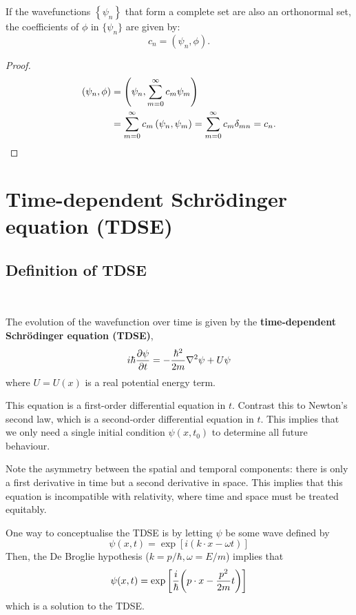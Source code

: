 \documentclass[a4paper,11pt]{article}
\begin{document}
\begin{lemma}
    If the wavefunctions $\left\{\psi_n\right\}$ that form a complete set are also an orthonormal set, the coefficients of $ \phi $ in $ \{\psi_n\} $ are given by:
    \[
    c_n=\left(\psi_n, \phi\right).
    \]
\end{lemma}
\begin{proof}
    \begin{align*}
        \left(\psi_n, \phi\right) &=\left(\psi_n, \sum_{m=0}^{\infty} c_m \psi_m\right) \\
        &=\sum_{m=0}^{\infty} c_m\left(\psi_n, \psi_m\right)=\sum_{m=0}^{\infty} c_m \delta_{m n}=c_n.\qedhere
    \end{align*}
\end{proof}

\section{Time-dependent Schr\"odinger equation (TDSE)}
\subsection{Definition of TDSE}\
\vspace{-1.5em}
\begin{definition}
	The evolution of the wavefunction over time is given by the \textbf{time-dependent Schr\"odinger equation (TDSE)},
	\[
		i\hbar \pdv{\psi}{t} = -\frac{\hbar^2}{2m} \laplacian \psi + U \psi
	\]
	where \( U = U(x) \) is a real potential energy term.
\end{definition}

\begin{remark}
	This equation is a first-order differential equation in \( t \).
	Contrast this to Newton's second law, which is a second-order differential equation in \( t \).
	This implies that we only need a single initial condition \( \psi(x,t_0) \) to determine all future behaviour.
\end{remark}
\begin{remark}
	Note the asymmetry between the spatial and temporal components: there is only a first derivative in time but a second derivative in space.
	This implies that this equation is incompatible with relativity, where time and space must be treated equitably.
\end{remark}
One way to conceptualise the TDSE is by letting \( \psi \) be some wave defined by
\[
	\psi(x,t) = \exp[ i(k \cdot x - \omega t) ]
\]
Then, the De Broglie hypothesis (\( k = p/\hbar, \omega = E/m \)) implies that
\[
	\psi(x,t) = \exp\qty[\frac{i}{\hbar}\qty(p \cdot x - \frac{p^2}{2m}t)]
\]
which is a solution to the TDSE.
\end{document}
